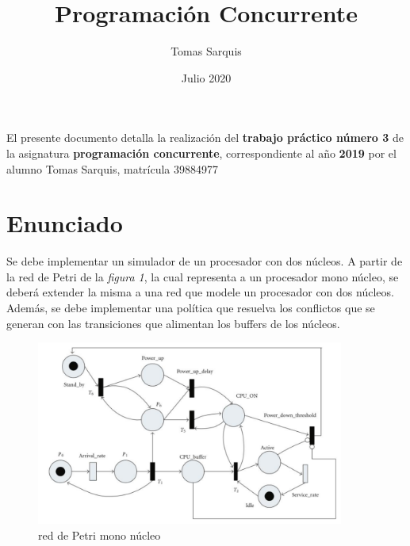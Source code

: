 \documentclass{article}
\title{Programación Concurrente}
\author{Tomas Sarquis}
\date{Julio 2020}
\begin{document}
    \begin{titlingpage}
        \maketitle
        \vspace*{\fill}
        El presente documento detalla la realización del \textbf{trabajo práctico número 3} 
        de la asignatura \textbf{programación concurrente}, correspondiente al año \textbf{2019}
        por el alumno Tomas Sarquis, matrícula 39884977
        \vspace*{\fill}
    \end{titlingpage}
    \section{Enunciado}
    \begin{flushleft}
        Se debe implementar un simulador de un procesador con dos núcleos. A partir de la red de
        Petri de la \emph{figura 1}, la cual representa a un procesador mono núcleo, se deberá 
        extender la misma a una red que modele un procesador con dos núcleos. Además, se debe
        implementar una política que resuelva los conflictos que se generan con las transiciones
        que alimentan los buffers de los núcleos.
    \end{flushleft}
    \begin{figure}[h]
        \includegraphics[width=0.9\textwidth, center]{rdp_enun.png}
        \caption{red de Petri mono núcleo}
    \end{figure}
\end{document}
